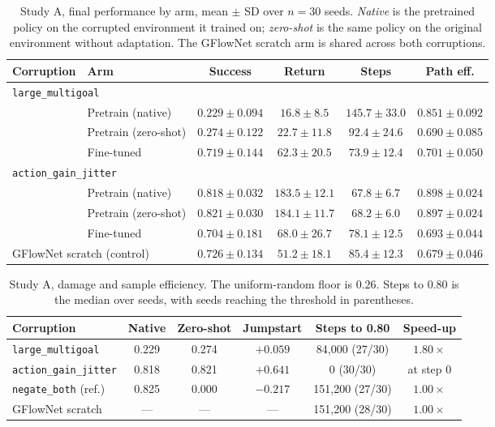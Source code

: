 \begin{table}[htbp]
\centering
\setlength{\tabcolsep}{4pt}
\caption{Study A, final performance by arm, mean $\pm$ SD over $n=30$ seeds.
\emph{Native} is the pretrained policy on the corrupted environment it trained
on; \emph{zero-shot} is the same policy on the original environment without
adaptation. The GFlowNet scratch arm is shared across both corruptions.}
\small
\begin{tabular}{llcccc}
\toprule
Corruption & Arm & Success & Return & Steps & Path eff. \\
\midrule
\multicolumn{6}{l}{\texttt{large\_multigoal}} \\
 & Pretrain (native)    & $0.229 \pm 0.094$ & $16.8 \pm 8.5$ & $145.7 \pm 33.0$ & $0.851 \pm 0.092$ \\
 & Pretrain (zero-shot) & $0.274 \pm 0.122$ & $22.7 \pm 11.8$ & $92.4 \pm 24.6$ & $0.690 \pm 0.085$ \\
 & Fine-tuned           & $0.719 \pm 0.144$ & $62.3 \pm 20.5$ & $73.9 \pm 12.4$ & $0.701 \pm 0.050$ \\
\midrule
\multicolumn{6}{l}{\texttt{action\_gain\_jitter}} \\
 & Pretrain (native)    & $0.818 \pm 0.032$ & $183.5 \pm 12.1$ & $67.8 \pm 6.7$ & $0.898 \pm 0.024$ \\
 & Pretrain (zero-shot) & $0.821 \pm 0.030$ & $184.1 \pm 11.7$ & $68.2 \pm 6.0$ & $0.897 \pm 0.024$ \\
 & Fine-tuned           & $0.704 \pm 0.181$ & $68.0 \pm 26.7$ & $78.1 \pm 12.5$ & $0.693 \pm 0.044$ \\
\midrule
\multicolumn{2}{l}{GFlowNet scratch (control)} & $0.726 \pm 0.134$ & $51.2 \pm 18.1$ & $85.4 \pm 12.3$ & $0.679 \pm 0.046$ \\
\bottomrule
\end{tabular}
\end{table}

\begin{table}[htbp]
\centering
\setlength{\tabcolsep}{4pt}
\caption{Study A, damage and sample efficiency. The uniform-random floor is
$0.26$. Steps to $0.80$ is the median over seeds, with seeds reaching the
threshold in parentheses.}
\small
\begin{tabular}{lccccc}
\toprule
Corruption & Native & Zero-shot & Jumpstart & Steps to 0.80 & Speed-up \\
\midrule
\texttt{large\_multigoal} & 0.229 & 0.274 & $+0.059$ & 84,000 (27/30) & $1.80\times$ \\
\texttt{action\_gain\_jitter} & 0.818 & 0.821 & $+0.641$ & 0 (30/30) & at step 0 \\
\texttt{negate\_both} (ref.) & 0.825 & 0.000 & $-0.217$ & 151,200 (27/30) & $1.00\times$ \\
\midrule
GFlowNet scratch & --- & --- & --- & 151,200 (28/30) & $1.00\times$ \\
\bottomrule
\end{tabular}
\end{table}

